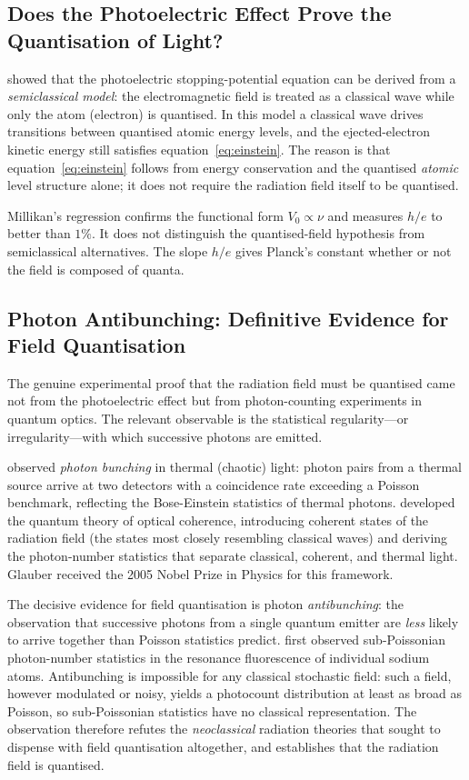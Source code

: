 \documentclass[12pt]{article}
\begin{document}
\subsection{Does the Photoelectric Effect Prove the Quantisation of Light?}
\label{app:lamb_scully}

\citet{Lamb1969} showed that the photoelectric stopping-potential equation
can be derived from a \emph{semiclassical model}: the electromagnetic
field is treated as a classical wave while only the atom (electron) is
quantised.  In this model a classical wave drives transitions between
quantised atomic energy levels, and the ejected-electron kinetic energy
still satisfies equation~\eqref{eq:einstein}.  The reason is that
equation~\eqref{eq:einstein} follows from energy conservation and the
quantised \emph{atomic} level structure alone; it does not require the
radiation field itself to be quantised.

Millikan's regression confirms the functional form $V_0 \propto \nu$ and
measures $h/e$ to better than $1\%$.  It does not distinguish the quantised-field
hypothesis from semiclassical alternatives.  The slope $h/e$ gives Planck's
constant whether or not the field is composed of quanta.

\subsection{Photon Antibunching: Definitive Evidence for Field Quantisation}
\label{app:antibunching}

The genuine experimental proof that the radiation field must be quantised
came not from the photoelectric effect but from photon-counting
experiments in quantum optics.  The relevant observable is the
statistical regularity---or irregularity---with which successive photons
are emitted.

\citet{HanburyBrown1956} observed \emph{photon bunching} in thermal
(chaotic) light: photon pairs from a thermal source arrive at two
detectors with a coincidence rate exceeding a Poisson benchmark, reflecting
the Bose-Einstein statistics of thermal photons.  \citet{Glauber1963}
developed the quantum theory of optical coherence, introducing coherent
states of the radiation field (the states most closely resembling classical
waves) and deriving the photon-number statistics that separate classical,
coherent, and thermal light.  Glauber received the 2005 Nobel Prize in
Physics for this framework.

The decisive evidence for field quantisation is photon
\emph{antibunching}: the observation that successive photons from a
single quantum emitter are \emph{less} likely to arrive together than
Poisson statistics predict.  \citet{Kimble1977} first observed
sub-Poissonian photon-number statistics in the resonance fluorescence of
individual sodium atoms.  Antibunching is impossible for any classical stochastic field: such a field,
however modulated or noisy, yields a photocount distribution at least as broad
as Poisson, so sub-Poissonian statistics have no classical representation.
The observation therefore refutes the \emph{neoclassical} radiation theories
that sought to dispense with field quantisation altogether, and establishes
that the radiation field is quantised.
\end{document}
